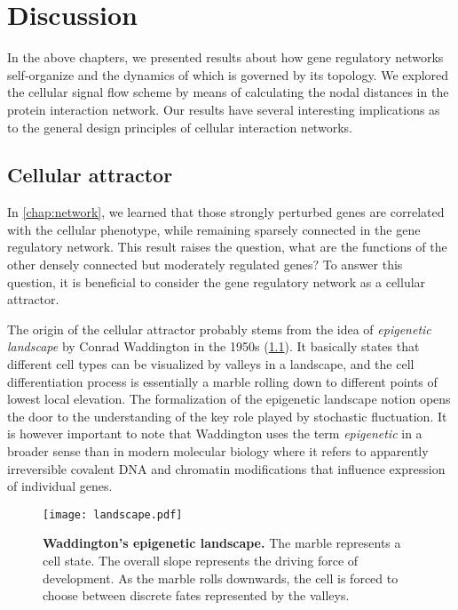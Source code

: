\chapter{Discussion}
In the above chapters, we presented results about how gene regulatory networks
self-organize and the dynamics of which is governed by its topology. We explored
the cellular signal flow scheme by means of calculating the nodal distances in
the protein interaction network. Our results have several interesting implications
as to the general design principles of cellular interaction networks.

\section{Cellular attractor}
In \ref{chap:network}, we learned that those strongly perturbed genes are
correlated with the cellular phenotype, while remaining sparsely connected in
the gene regulatory network. This result raises the question, what are the
functions of the other densely connected but moderately regulated genes? 
To answer this question, it is beneficial to consider the gene regulatory network
as a cellular attractor.

The origin of the cellular attractor probably stems from the idea of 
\emph{epigenetic landscape} by Conrad Waddington in the 1950s 
(\ref{fig:landscape}). It basically
states that different cell types can be visualized by valleys in a landscape,
and the cell differentiation process is essentially a marble rolling down to
different points of lowest local elevation. The formalization of the epigenetic landscape notion opens the door to the understanding of the key role played by stochastic fluctuation. 
It is however important to note that Waddington uses the term \emph{epigenetic} in a broader sense than in modern molecular biology where it refers to apparently irreversible covalent DNA and chromatin modifications that influence expression of individual genes.

\begin{figure}[!ht]
\begin{center}
\texttt{[image: landscape.pdf]}
\end{center}
\caption[Waddington's epigenetic landscape]{
{\bf Waddington's epigenetic landscape.}
The marble represents a cell state. The overall slope represents the driving force of development. As the marble rolls downwards, the cell is forced to choose between discrete fates represented by the valleys.
}
\label{fig:landscape}
\end{figure}

